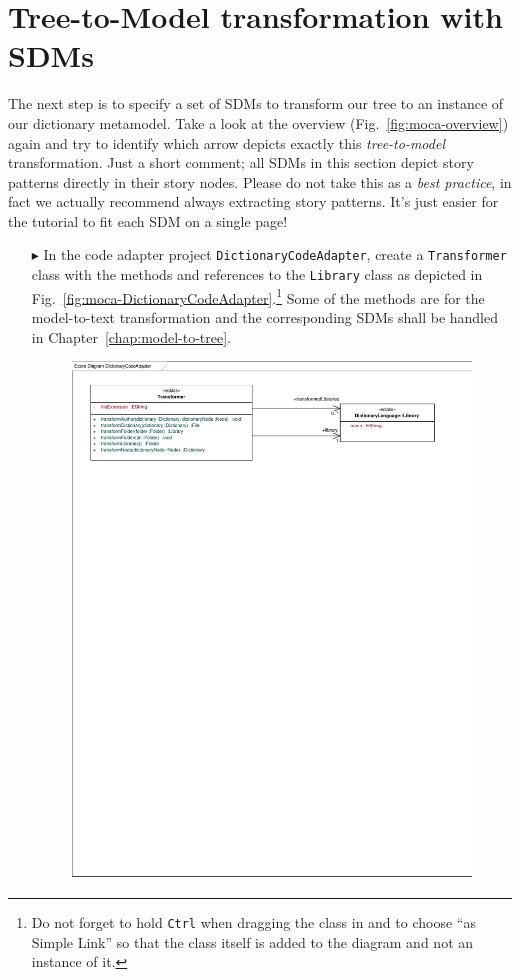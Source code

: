 \section{Tree-to-Model transformation with SDMs}

The next step is to specify a set of SDMs to transform our tree to an instance of our dictionary metamodel.
Take a look at the overview (Fig.~\ref{fig:moca-overview}) again and try to identify which arrow depicts exactly this \emph{tree-to-model} transformation.
Just a short comment;  all SDMs in this section depict story patterns directly in their story nodes.
Please do not take this as a \emph{best practice}, in fact we actually recommend always extracting story patterns.
It's just easier for the tutorial to fit each SDM on a single page!

\begin{enumerate}
  \item[$\blacktriangleright$]  In the code adapter project
  \texttt{DictionaryCodeAdapter}, create a \texttt{Trans\-for\-mer} class with the methods and references to the \texttt{Library} class as depicted in Fig.~\ref{fig:moca-DictionaryCodeAdapter}.\footnote{Do not forget to hold \texttt{Ctrl} when dragging the class in and to choose ``as Simple Link'' so that the class itself is added to the diagram and not an instance of it.}
  Some of the methods are for the model-to-text transformation and the corresponding SDMs shall be handled in Chapter~\ref{chap:model-to-tree}.
\begin{figure}[!htbp]
\begin{center}
 \includegraphics[width=\textwidth]{pics/moca/3MocaTreeToModel/DictionaryCodeAdapter}

\end{center}
\end{figure}
\end{enumerate}
